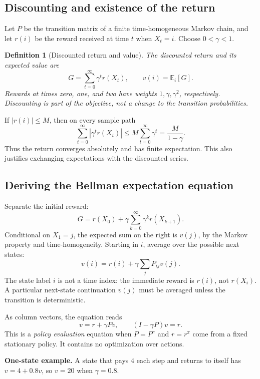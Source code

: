 \documentclass[11pt]{article}
\newtheorem{definition}{Definition}[section]
\theoremstyle{remark}\newtheorem{remark}[definition]{Remark}
\newcommand{\E}{\mathbb E}\newcommand{\Prob}{\mathbb P}
\begin{document}
\subsection{Discounting and existence of the return}
Let $P$ be the transition matrix of a finite time-homogeneous Markov chain, and let $r(i)$ be the reward received at time $t$ when $X_t=i$. Choose $0<\gamma<1$.
\begin{definition}[Discounted return and value]
The discounted return and its expected value are
\[
G=\sum_{t=0}^\infty\gamma^t r(X_t),\qquad
v(i)=\E_i[G].
\]
Rewards at times zero, one, and two have weights $1,\gamma,\gamma^2$, respectively. Discounting is part of the objective, not a change to the transition probabilities.
\end{definition}
If $|r(i)|\leq M$, then on every sample path
\[
\sum_{t=0}^\infty|\gamma^t r(X_t)|\leq M\sum_{t=0}^\infty\gamma^t
=\frac{M}{1-\gamma}.
\]
Thus the return converges absolutely and has finite expectation. This also justifies exchanging expectations with the discounted series.

\subsection{Deriving the Bellman expectation equation}
Separate the initial reward:
\[
G=r(X_0)+\gamma\sum_{k=0}^\infty\gamma^k r(X_{k+1}).
\]
Conditional on $X_1=j$, the expected sum on the right is $v(j)$, by the Markov property and time-homogeneity. Starting in $i$, average over the possible next states:
\[
\boxed{v(i)=r(i)+\gamma\sum_jP_{ij}v(j).}
\]
The state label $i$ is not a time index: the immediate reward is $r(i)$, not $r(X_i)$. A particular next-state continuation $v(j)$ must be averaged unless the transition is deterministic.

As column vectors, the equation reads
\[
v=r+\gamma Pv,\qquad (I-\gamma P)v=r.
\]
This is a \emph{policy evaluation} equation when $P=P^\pi$ and $r=r^\pi$ come from a fixed stationary policy. It contains no optimization over actions.

\textbf{One-state example.} A state that pays $4$ each step and returns to itself has $v=4+0.8v$, so $v=20$ when $\gamma=0.8$.

\clearpage
\end{document}
